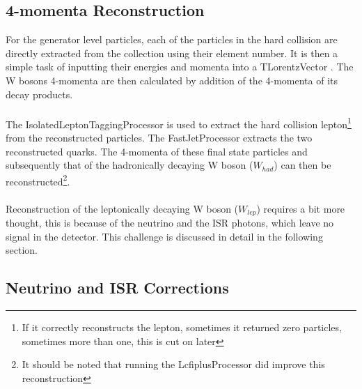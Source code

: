 \subsection{4-momenta Reconstruction}
\label{SUBSEC:4momentaReconstruction}
For the generator level particles, each of the particles in the hard collision are directly extracted from the collection using their element number. It is then a simple task of inputting their energies and momenta into a TLorentzVector \cite{fons_rademakers_2019_3336325}. The W bosons 4-momenta are then calculated by addition of the 4-momenta of its decay products.
\\\\
The IsolatedLeptonTaggingProcessor \cite{IsolatedLeptonTaggingProcessor} is used to extract the hard collision lepton\footnote{If it correctly reconstructs the lepton, sometimes it returned zero particles, sometimes more than one, this is cut on later} from the reconstructed particles. The FastJetProcessor \cite{Cacciari:2011ma} extracts the two reconstructed quarks. The 4-momenta of these final state particles and subsequently that of the hadronically decaying W boson (${W}_{had}$) can then be reconstructed\footnote{It should be noted that running the LcfiplusProcessor \cite{reVertex} did improve this reconstruction}.
\\\\
Reconstruction of the leptonically decaying W boson (${W}_{lep}$) requires a bit more thought, this is because of the neutrino and the ISR photons, which leave no signal in the detector. This challenge is discussed in detail in the following section.

\subsection{Neutrino and ISR Corrections}
